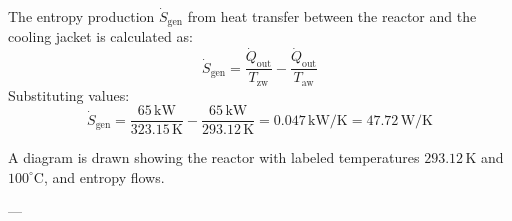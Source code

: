 The entropy production \( \dot{S}_{\text{gen}} \) from heat transfer between the reactor and the cooling jacket is calculated as:  
\[
\dot{S}_{\text{gen}} = \frac{\dot{Q}_{\text{out}}}{T_{\text{zw}}} - \frac{\dot{Q}_{\text{out}}}{T_{\text{aw}}}
\]  
Substituting values:  
\[
\dot{S}_{\text{gen}} = \frac{65 \, \text{kW}}{323.15 \, \text{K}} - \frac{65 \, \text{kW}}{293.12 \, \text{K}} = 0.047 \, \text{kW/K} = 47.72 \, \text{W/K}
\]  

A diagram is drawn showing the reactor with labeled temperatures \( 293.12 \, \text{K} \) and \( 100^\circ\text{C} \), and entropy flows.  

---